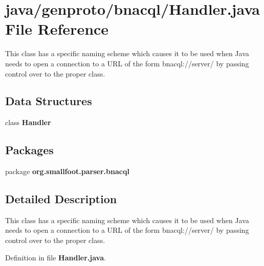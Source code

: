 \section{java/genproto/bnacql/\+Handler.java File Reference}
\label{genproto_2bnacql_2Handler_8java}


This class has a specific naming scheme which causes it to be used when Java needs to open a connection to a U\+R\+L of the form bnacql\+://server/ by passing control over to the proper class.  


\subsection*{Data Structures}
\begin{DoxyCompactItemize}
\item 
class {\bf Handler}
\end{DoxyCompactItemize}
\subsection*{Packages}
\begin{DoxyCompactItemize}
\item 
package {\bf org.\+smallfoot.\+parser.\+bnacql}
\end{DoxyCompactItemize}


\subsection{Detailed Description}
This class has a specific naming scheme which causes it to be used when Java needs to open a connection to a U\+R\+L of the form bnacql\+://server/ by passing control over to the proper class. 



Definition in file {\bf Handler.\+java}.

